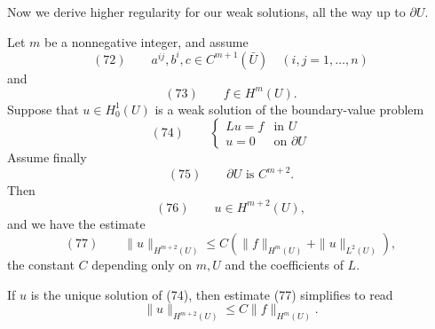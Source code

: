 Now we derive higher regularity for our weak solutions, all the way up to $\partial U$.

\begin{theorem}
\label{thm:higher-boundary-regularity}
Let $m$ be a nonnegative integer, and assume
$$(72) \qquad a^{ij}, b^i, c \in C^{m+1}(\bar U) \quad (i,j=1,\ldots,n)$$
and
$$(73) \qquad f \in H^m(U).$$
Suppose that $u \in H_0^1(U)$ is a weak solution of the boundary-value problem
$$(74) \qquad \begin{cases} Lu = f & \text{in } U \\ u = 0 & \text{on } \partial U \end{cases}$$
Assume finally
$$(75) \qquad \partial U \text{ is } C^{m+2}.$$
Then
$$(76) \qquad u \in H^{m+2}(U),$$
and we have the estimate
$$(77) \qquad \|u\|_{H^{m+2}(U)} \leq C(\|f\|_{H^m(U)} + \|u\|_{L^2(U)}),$$
the constant $C$ depending only on $m, U$ and the coefficients of $L$.
\end{theorem}

\begin{remark}
\label{rem:higher-boundary-regularity-simplified}
If $u$ is the unique solution of (74), then estimate (77) simplifies to read
$$\|u\|_{H^{m+2}(U)} \leq C\|f\|_{H^m(U)}.$$
\end{remark}

